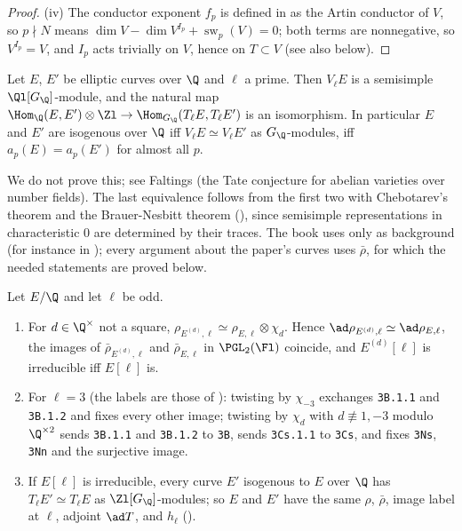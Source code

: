 \begin{proof}
(iv) The conductor exponent $f_p$ is defined in  as the Artin conductor of $V$, so $p\nmid N$ means
$\dim V-\dim V^{I_p}+\operatorname{sw}_p(V)=0$; both terms are nonnegative, so $V^{I_p}=V$, and $I_p$ acts trivially on $V$, hence on $T\subset V$
(see also  below).
\end{proof}

\begin{theorem}[Faltings]\label{thm:galrep:faltings}
Let $E$, $E'$ be elliptic curves over $\Q$ and $\ell$ a prime. Then $V_\ell E$ is a semisimple $\Ql[G_\Q]$-module, and the natural map
$\Hom_\Q(E,E')\otimes\Zl\to\Hom_{G_\Q}(T_\ell E,T_\ell E')$ is an isomorphism. In particular $E$ and $E'$ are isogenous over $\Q$ iff $V_\ell E\simeq V_\ell E'$ as
$G_\Q$-modules, iff $a_p(E)=a_p(E')$ for almost all $p$.
\end{theorem}

We do not prove this; see Faltings \cite{Faltings83} (the Tate conjecture for abelian varieties over number fields). The last equivalence
follows from the first two with Chebotarev's theorem and the Brauer-Nesbitt theorem (), since semisimple representations
in characteristic $0$ are determined by their traces. The book uses  only as background (for instance in
); every argument about the paper's curves uses $\bar\rho$, for which the needed statements are proved below.

\begin{proposition}\label{prop:galrep:twist-isogeny}
Let $E/\Q$ and let $\ell$ be odd.
\begin{enumerate}[label=(\roman*)]
\item For $d\in\Q^\times$ not a square, $\rho_{E^{(d)},\ell}\simeq\rho_{E,\ell}\otimes\chi_d$. Hence $\ad\rho_{E^{(d)},\ell}\simeq\ad\rho_{E,\ell}$, the images of
$\bar\rho_{E^{(d)},\ell}$ and $\bar\rho_{E,\ell}$ in $\PGL_2(\Fl)$ coincide, and $E^{(d)}[\ell]$ is irreducible iff $E[\ell]$ is.
\item For $\ell=3$ (the labels are those of ): twisting by $\chi_{-3}$ exchanges \texttt{3B.1.1} and \texttt{3B.1.2}
and fixes every other image; twisting by $\chi_d$ with $d\not\equiv1,-3$ modulo $\Q^{\times2}$ sends \texttt{3B.1.1} and \texttt{3B.1.2} to
\texttt{3B}, sends \texttt{3Cs.1.1} to \texttt{3Cs}, and fixes \texttt{3Ns}, \texttt{3Nn} and the surjective image.
\item If $E[\ell]$ is irreducible, every curve $E'$ isogenous to $E$ over $\Q$ has $T_\ell E'\simeq T_\ell E$ as $\Zl[G_\Q]$-modules; so $E$ and $E'$ have
the same $\rho$, $\bar\rho$, image label at $\ell$, adjoint $\ad T$, and $h_\ell$ ().
\end{enumerate}
\end{proposition}

